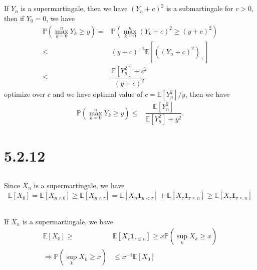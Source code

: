 \documentclass[11pt,a4paper]{ctexart}
\numberwithin{equation}{section}%
\begin{document}
\subsection{}

If $ Y_n $ is a supermartingale, then we have $ (Y_n+c)^2 $ is a submartingale for $ c>0 $, then if $ Y_0=0 $, we have
\begin{align*}
    \mathbb{P}\left( \mathop{ \max }\limits_{k=0}^n Y_k\geq y  \right)  =& \mathbb{P}\left( \mathop{ \max }\limits_{k=0}^n (Y_k+c)^2\geq (y+c)^2  \right) \\
    \leq& (y+c)^{-2}\mathbb{E}\left[ ((Y_n+c)^2)_+ \right] \\
    \leq &\dfrac{ \mathbb{E}\left[ Y_n^2 \right] + c^2  }{ (y+c)^2 }
\end{align*}
optimize over $ c $ and we have optimal value of $ c=\mathbb{E}\left[ Y_n^2 \right]/y $, then we have
\begin{align*}
    \mathbb{P}\left( \mathop{ \max }\limits_{k=0}^n Y_k\geq y  \right)  \leq & \dfrac{ \mathbb{E}\left[ Y_n^2 \right] }{ \mathbb{E}\left[ Y_n^2 \right] + y^2  }.
\end{align*}

\section{5.2.12}

\subsection{}

Since $ X_n $ is a supermartingale, we have
\begin{align*}
    \mathbb{E}\left[ X_0 \right] = \mathbb{E}\left[ X_{n\wedge 0} \right] \geq \mathbb{E}\left[ X_{n\wedge \tau} \right] = \mathbb{E}\left[ X_n \mathbf{1}_{n<\tau} \right]+ \mathbb{E}\left[ X_\tau\mathbf{1}_{\tau\leq n} \right] \geq    \mathbb{E}\left[ X_\tau\mathbf{1}_{\tau\leq n} \right]   
\end{align*}

\subsection{}

If $ X_n $ is a supermartingale, we have
\begin{align*}
    \mathbb{E}\left[ X_0 \right] \geq& \mathbb{E}\left[ X_\tau \mathbf{1}_{\tau \leq n} \right] 
    \geq  x\mathbb{P}\left( \mathop{ \sup }\limits_{k} X_k \geq x \right)\\
     \Rightarrow \mathbb{P}\left( \mathop{ \sup }\limits_{k} X_k \geq x \right) & \leq  x^{-1}\mathbb{E}\left[ X_0 \right]
\end{align*}
\end{document}
